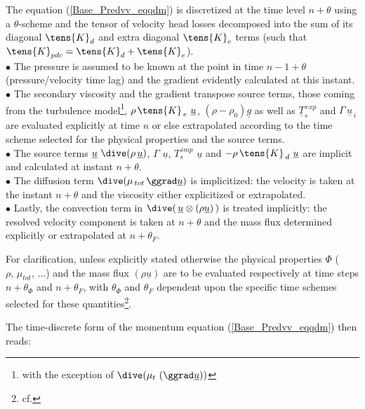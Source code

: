 The equation (\ref{Base_Predvv_eqqdm}) is discretized at the time level
$n+\theta$ using a $\theta$-scheme and the tensor of velocity head losses
decomposed into the sum of its diagonal $\tens{K}_{d}$ and extra diagonal $\tens{K}_{e}$ terms (such that
 $\tens{K}_{pdc}=\tens{K}_{d}+\tens{K}_{e}$).\\
$\bullet$ The pressure is assumed to be known at the point in time $n-1+\theta$
(pressure/velocity time lag) and the gradient evidently calculated at this instant.\\
$\bullet$ The secondary viscosity and the gradient transpose source terms,
those coming from the turbulence model\footnote{with the exception of $\dive (\mu_t\ (\ggrad
\underline {u}))$}, $\rho\,\tens{K}_{\,e}\ \underline{u}$, $(\rho -\rho_0)
\underline {g}$ as well as $\underline{T}_{s}^{\,exp}$ and
$\Gamma\,\underline{u}_{\,i}$ are evaluated explicitly at time $n$ or else
extrapolated according to the time scheme selected for the physical properties and the
source terms.\\
$\bullet$ The source terms $\underline{u}\,\,\dive (\rho\,\underline {u})$,
$\Gamma\,\,\underline{u}$, $T_{s}^{\,imp}\,\,\underline{u}$ and
$-\rho\,\tens{K}_{\,d}\,\,\underline{u}$ are implicit and calculated at
instant $n+\theta$.\\
$\bullet$ The diffusion term  $\dive (\mu_{\,tot}\,\ggrad \underline{u})$ is implicitized: the velocity is taken at the instant $n+\theta$ and the viscosity either explicitized or extrapolated.\\
$\bullet$ Lastly, the convection term in $\dive(\,\underline{u} \otimes
(\rho\underline{u})\,)$ is treated implicitly: the resolved velocity
component is
taken at $n+\theta$ and the mass flux determined explicitly or extrapolated
at
$n+\theta_F$.

For clarification, unless explicitly stated otherwise the physical properties
$\Phi$ ($\rho,\,\mu_{tot},\,...$) and the mass flux $(\rho\underline{u})$
are  to be evaluated respectively at time steps $n+\theta_\Phi$ and
$n+\theta_F$, with $\theta_\Phi$ and $\theta_F$ dependent upon the specific
time schemes selected for these quantities\footnote{cf. }.

The time-discrete form of the momentum equation (\ref{Base_Predvv_eqqdm}) then reads:

